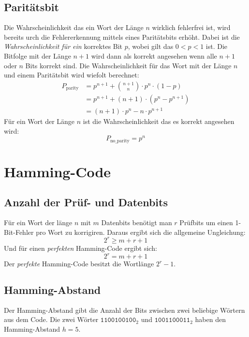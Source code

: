 \documentclass
[
	8pt,		%
	ngerman,	%
	a4paper,	%
	landscape,	%
	final		%
]{extarticle}
\begin{document}
\begin{multicols*}{4}
	\subsection{Paritätsbit}
	Die Wahrscheinlichkeit das ein Wort der Länge \(n\) wirklich fehlerfrei ist,
	wird bereits urch die Fehlererkennung mittels eines Paritätsbits erhöht.
	Dabei ist die \emph{Wahrscheinlichkeit für ein} korrektes Bit \(p\), wobei
	gilt das \(0<p<1\) ist. Die Bitfolge mit der Länge \(n+1\) wird dann als
	korrekt angesehen wenn alle \(n+1\) oder \(n\) Bits korrekt sind.
	Die Wahrscheinlichkeit für das Wort mit der Länge \(n\) und einem
	Paritätsbit wird wiefolt berechnet:
	\begin{align*}
		P_{\text{parity}} & = p^{n+1}+\binom{n+1}{n}\cdot p^{n}\cdot\left(1-p\right)  \\
		                  & = p^{n+1}+\left(n+1\right)\cdot\left(p^{n}-p^{n+1}\right) \\
		                  & = \left(n+1\right)\cdot p^{n}-n\cdot p^{n + 1}
	\end{align*}
	Für ein Wort der Länge \(n\) ist die Wahrscheinlichkeit das es korrekt
	angesehen wird: \[P_{\text{no\_parity}} = p^{n}\]
	\section{Hamming-Code}
	\subsection{Anzahl der Prüf- und Datenbits}
	Für ein Wort der länge \(n\) mit \(m\) Datenbits benötigt man \(r\) Prüfbits
	um einen 1-Bit-Fehler pro Wort zu korrigiren.
	Daraus ergibt sich die allgemeine Ungleichung: \[2^{r} \geq m + r + 1\]
	Und für einen \emph{perfekten} Hamming-Code ergibt sich: \[2^{r} = m + r + 1\]
	Der \emph{perfekte} Hamming-Code besitzt die Wortlänge \(2^{r} - 1\).
	\subsection{Hamming-Abstand}
	Der Hamming-Abstand gibt die Anzahl der Bits zwischen zwei beliebige Wörtern
	aus dem Code.
	\example
	Die zwei Wörter \(\texttt{1100100100}_2\) und \(\texttt{1001100011}_2\)
	haben den Hamming-Abstand \(h = 5\).

\end{multicols*}
\end{document}
